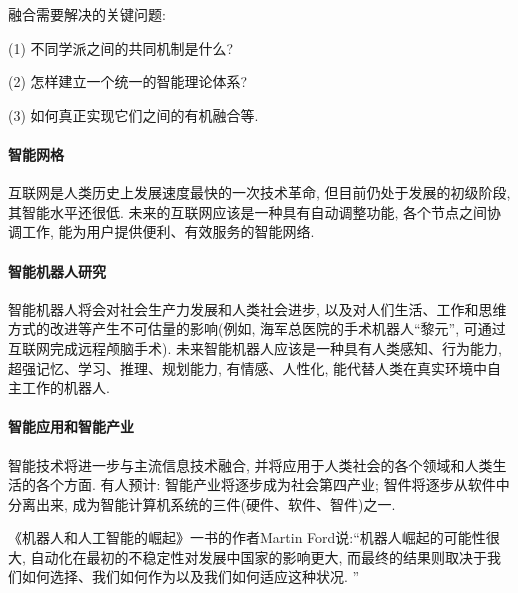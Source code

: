 融合需要解决的关键问题:

(1) 不同学派之间的共同机制是什么?

(2) 怎样建立一个统一的智能理论体系?

(3) 如何真正实现它们之间的有机融合等.
\paragraph{智能网格}

互联网是人类历史上发展速度最快的一次技术革命, 但目前仍处于发展的初级阶段, 其智能水平还很低.
未来的互联网应该是一种具有自动调整功能, 各个节点之间协调工作, 能为用户提供便利、有效服务的智能网络.
\paragraph{智能机器人研究}

智能机器人将会对社会生产力发展和人类社会进步, 以及对人们生活、工作和思维方式的改进等产生不可估量的影响(例如, 海军总医院的手术机器人“黎元”, 可通过互联网完成远程颅脑手术).
未来智能机器人应该是一种具有人类感知、行为能力, 超强记忆、学习、推理、规划能力, 有情感、人性化, 能代替人类在真实环境中自主工作的机器人.
\paragraph{智能应用和智能产业}

智能技术将进一步与主流信息技术融合, 并将应用于人类社会的各个领域和人类生活的各个方面.
有人预计: 智能产业将逐步成为社会第四产业; 智件将逐步从软件中分离出来, 成为智能计算机系统的三件(硬件、软件、智件)之一.

《机器人和人工智能的崛起》一书的作者Martin Ford说:“机器人崛起的可能性很大, 自动化在最初的不稳定性对发展中国家的影响更大, 而最终的结果则取决于我们如何选择、我们如何作为以及我们如何适应这种状况. ”
